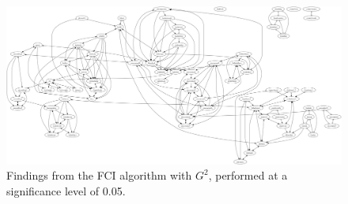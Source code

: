 \begin{figure}[htb]
    \centering
    \includegraphics[scale=0.1]{Report/final_report/pictures/FCI_gsq_0.05_all_UA_78_famdec.png}
    \caption{Findings from the FCI algorithm with $G^2$, performed at a significance level of 0.05.}
    \label{fig:fci_gsq_0.05all_UA_78_famdec}
\end{figure}
